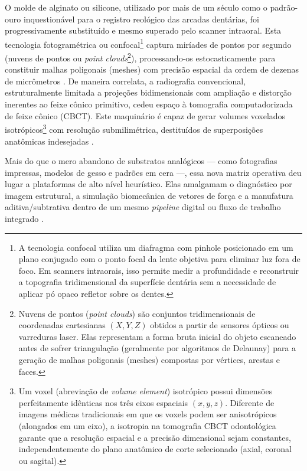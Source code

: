 O molde de alginato ou silicone, utilizado por mais de um século como o padrão-ouro inquestionável para o registro reológico das arcadas dentárias, foi progressivamente substituído e mesmo superado pelo scanner intraoral. Esta tecnologia fotogramétrica ou confocal\footnote{A tecnologia confocal utiliza um diafragma com pinhole posicionado em um plano conjugado com o ponto focal da lente objetiva para eliminar luz fora de foco. Em scanners intraorais, isso permite medir a profundidade e reconstruir a topografia tridimensional da superfície dentária sem a necessidade de aplicar pó opaco refletor sobre os dentes.} captura miríades de pontos por segundo (nuvens de pontos ou \textit{point clouds}\footnote{Nuvens de pontos (\textit{point clouds}) são conjuntos tridimensionais de coordenadas cartesianas $(X, Y, Z)$ obtidos a partir de sensores ópticos ou varreduras laser. Elas representam a forma bruta inicial do objeto escaneado antes de sofrer triangulação (geralmente por algoritmos de Delaunay) para a geração de malhas poligonais (meshes) compostas por vértices, arestas e faces.}), processando-os estocasticamente para constituir malhas poligonais (meshes) com precisão espacial da ordem de dezenas de micrômetros \cite{elsaid2025digital}. De maneira correlata, a radiografia convencional, estruturalmente limitada a projeções bidimensionais com ampliação e distorção inerentes ao feixe cônico primitivo, cedeu espaço à tomografia computadorizada de feixe cônico (CBCT). Este maquinário é capaz de gerar volumes voxelados isotrópicos\footnote{Um voxel (abreviação de \textit{volume element}) isotrópico possui dimensões perfeitamente idênticas nos três eixos espaciais $(x, y, z)$. Diferente de imagens médicas tradicionais em que os voxels podem ser anisotrópicos (alongados em um eixo), a isotropia na tomografia CBCT odontológica garante que a resolução espacial e a precisão dimensional sejam constantes, independentemente do plano anatômico de corte selecionado (axial, coronal ou sagital).} com resolução submilimétrica, destituídos de superposições anatômicas indesejadas \cite{li2025impacts}.

Mais do que o mero abandono de substratos analógicos — como fotografias impressas, modelos de gesso e padrões em cera —, essa nova matriz operativa deu lugar a plataformas de alto nível heurístico. Elas amalgamam o diagnóstico por imagem estrutural, a simulação biomecânica de vetores de força e a manufatura aditiva/subtrativa dentro de um mesmo \textit{pipeline} digital ou fluxo de trabalho integrado \cite{techsoc2025precision}.

